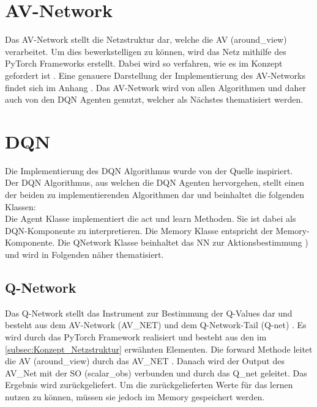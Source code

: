 \section{AV-Network} \label{sec:Implementierung_AV_Network}
Das AV-Network stellt die Netzstruktur dar, welche die AV (around\_view) verarbeitet. Um dies bewerkstelligen zu können, wird das Netz mithilfe des PyTorch Frameworks erstellt. Dabei wird so verfahren, wie es im Konzept gefordert ist . Eine genauere Darstellung der Implementierung des AV-Networks findet sich im Anhang  . Das AV-Network wird von allen Algorithmen und daher auch von den DQN Agenten genutzt, welcher als Nächstes thematisiert werden.

\section{DQN} \label{sec:Implementierung_DQN}
Die Implementierung des DQN Algorithmus wurde von der Quelle \citep{Charles2013} inspiriert.\\
Der DQN Algorithmus, aus welchen die DQN Agenten hervorgehen, stellt einen der beiden zu implementierenden Algorithmen dar und beinhaltet die folgenden Klassen:\\
Die Agent Klasse implementiert die act  und learn  Methoden. Sie ist dabei als DQN-Komponente zu interpretieren.
Die Memory Klasse entspricht der Memory-Komponente. Die QNetwork Klasse beinhaltet das NN zur Aktionsbestimmung ) und wird in Folgenden näher thematisiert.

\subsection{Q-Network} \label{subsec:Implementierung_Q-Network}
Das Q-Network stellt das Instrument zur Bestimmung der Q-Values dar und besteht aus dem AV-Network (AV\_NET)  und dem Q-Network-Tail (Q-net) .
Es wird durch das PyTorch Framework realisiert und besteht aus den im \autoref{subsec:Konzept_Netzstruktur} erwähnten Elementen.
Die forward Methode leitet die AV (around\_view) durch das AV\_NET . Danach wird der Output des AV\_Net mit der SO (scalar\_obs) verbunden und durch das Q\_net geleitet. Das Ergebnis wird zurückgeliefert. Um die zurückgelieferten Werte für das lernen nutzen zu können, müssen sie jedoch im Memory gespeichert werden.

